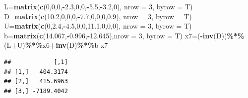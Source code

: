 \documentclass[
]{article}
\newenvironment{Shaded}{\begin{snugshade}}{\end{snugshade}}
\newcommand{\AttributeTok}[1]{\textcolor[rgb]{0.13,0.29,0.53}{#1}}
\newcommand{\DecValTok}[1]{\textcolor[rgb]{0.00,0.00,0.81}{#1}}
\newcommand{\FloatTok}[1]{\textcolor[rgb]{0.00,0.00,0.81}{#1}}
\newcommand{\FunctionTok}[1]{\textcolor[rgb]{0.13,0.29,0.53}{\textbf{#1}}}
\newcommand{\NormalTok}[1]{#1}
\newcommand{\OtherTok}[1]{\textcolor[rgb]{0.56,0.35,0.01}{#1}}
\newcommand{\SpecialCharTok}[1]{\textcolor[rgb]{0.81,0.36,0.00}{\textbf{#1}}}
\begin{document}
\begin{Shaded}
\begin{Highlighting}[]
\NormalTok{  L}\OtherTok{=}\FunctionTok{matrix}\NormalTok{(}\FunctionTok{c}\NormalTok{(}\DecValTok{0}\NormalTok{,}\DecValTok{0}\NormalTok{,}\DecValTok{0}\NormalTok{,}\SpecialCharTok{{-}}\FloatTok{2.3}\NormalTok{,}\DecValTok{0}\NormalTok{,}\DecValTok{0}\NormalTok{,}\SpecialCharTok{{-}}\FloatTok{5.5}\NormalTok{,}\SpecialCharTok{{-}}\FloatTok{3.2}\NormalTok{,}\DecValTok{0}\NormalTok{), }\AttributeTok{nrow =} \DecValTok{3}\NormalTok{, }\AttributeTok{byrow =}\NormalTok{ T)}
\NormalTok{  D}\OtherTok{=}\FunctionTok{matrix}\NormalTok{(}\FunctionTok{c}\NormalTok{(}\FloatTok{10.2}\NormalTok{,}\DecValTok{0}\NormalTok{,}\DecValTok{0}\NormalTok{,}\DecValTok{0}\NormalTok{,}\SpecialCharTok{{-}}\FloatTok{7.7}\NormalTok{,}\DecValTok{0}\NormalTok{,}\DecValTok{0}\NormalTok{,}\DecValTok{0}\NormalTok{,}\FloatTok{0.9}\NormalTok{), }\AttributeTok{nrow =} \DecValTok{3}\NormalTok{, }\AttributeTok{byrow =}\NormalTok{ T)}
\NormalTok{  U}\OtherTok{=}\FunctionTok{matrix}\NormalTok{(}\FunctionTok{c}\NormalTok{(}\DecValTok{0}\NormalTok{,}\FloatTok{2.4}\NormalTok{,}\SpecialCharTok{{-}}\FloatTok{4.5}\NormalTok{,}\DecValTok{0}\NormalTok{,}\DecValTok{0}\NormalTok{,}\FloatTok{11.1}\NormalTok{,}\DecValTok{0}\NormalTok{,}\DecValTok{0}\NormalTok{,}\DecValTok{0}\NormalTok{), }\AttributeTok{nrow =} \DecValTok{3}\NormalTok{, }\AttributeTok{byrow =}\NormalTok{ T)}
\NormalTok{  b}\OtherTok{=}\FunctionTok{matrix}\NormalTok{(}\FunctionTok{c}\NormalTok{(}\FloatTok{14.067}\NormalTok{,}\SpecialCharTok{{-}}\FloatTok{0.996}\NormalTok{,}\SpecialCharTok{{-}}\FloatTok{12.645}\NormalTok{),}\AttributeTok{nrow =} \DecValTok{3}\NormalTok{, }\AttributeTok{byrow =}\NormalTok{ T)}
\NormalTok{  x7}\OtherTok{=}\NormalTok{(}\SpecialCharTok{{-}}\FunctionTok{inv}\NormalTok{(D))}\SpecialCharTok{\%*\%}\NormalTok{(L}\SpecialCharTok{+}\NormalTok{U)}\SpecialCharTok{\%*\%}\NormalTok{x6}\SpecialCharTok{+}\FunctionTok{inv}\NormalTok{(D)}\SpecialCharTok{\%*\%}\NormalTok{b}
\NormalTok{  x7}
\end{Highlighting}
\end{Shaded}

\begin{verbatim}
##            [,1]
## [1,]   404.3174
## [2,]   415.6963
## [3,] -7189.4042
\end{verbatim}
\end{document}

